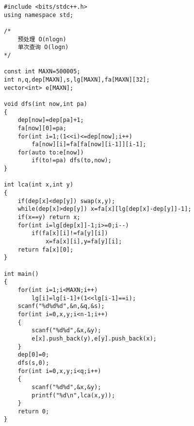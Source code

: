 \begin{lstlisting}
#include <bits/stdc++.h>
using namespace std;

/*
    预处理 O(nlogn)
    单次查询 O(logn)
*/

const int MAXN=500005;
int n,q,dep[MAXN],s,lg[MAXN],fa[MAXN][32];
vector<int> e[MAXN];

void dfs(int now,int pa)
{
    dep[now]=dep[pa]+1;
    fa[now][0]=pa;
    for(int i=1;(1<<i)<=dep[now];i++)
        fa[now][i]=fa[fa[now][i-1]][i-1];
    for(auto to:e[now])
        if(to!=pa) dfs(to,now);
}

int lca(int x,int y)
{
    if(dep[x]<dep[y]) swap(x,y);
    while(dep[x]>dep[y]) x=fa[x][lg[dep[x]-dep[y]]-1];
    if(x==y) return x;
    for(int i=lg[dep[x]]-1;i>=0;i--)
        if(fa[x][i]!=fa[y][i])
            x=fa[x][i],y=fa[y][i];
    return fa[x][0];
}

int main()
{
    for(int i=1;i<MAXN;i++)
        lg[i]=lg[i-1]+(1<<lg[i-1]==i);
    scanf("%d%d%d",&n,&q,&s);
    for(int i=0,x,y;i<n-1;i++)
    {
        scanf("%d%d",&x,&y);
        e[x].push_back(y),e[y].push_back(x);
    }
    dep[0]=0;
    dfs(s,0);
    for(int i=0,x,y;i<q;i++)
    {
        scanf("%d%d",&x,&y);
        printf("%d\n",lca(x,y));
    }
    return 0;
}
\end{lstlisting}